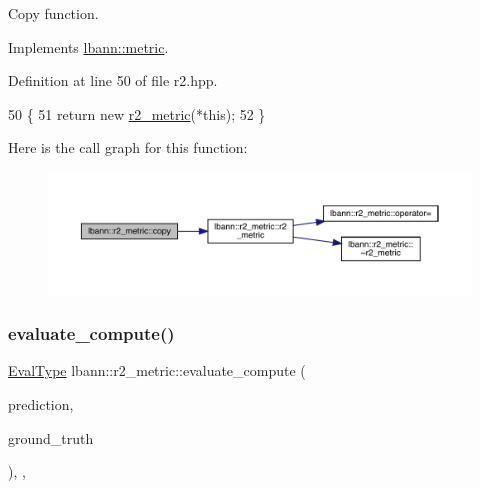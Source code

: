 Copy function. 

Implements \hyperlink{classlbann_1_1metric_a2a4498d41f77da8585552f485caab167}{lbann\+::metric}.



Definition at line 50 of file r2.\+hpp.


\begin{DoxyCode}
50                                    \{
51     \textcolor{keywordflow}{return} \textcolor{keyword}{new} \hyperlink{classlbann_1_1r2__metric_a9c6bffbb4724c77a8e6f8b1a2e7b27c7}{r2\_metric}(*\textcolor{keyword}{this});
52   \}
\end{DoxyCode}
Here is the call graph for this function\+:\nopagebreak
\begin{figure}[H]
\begin{center}
\leavevmode
\includegraphics[width=350pt]{classlbann_1_1r2__metric_a2536209f1d575b639ab351854d54f207_cgraph}
\end{center}
\end{figure}
\mbox{\label{classlbann_1_1r2__metric_a06c84d7944d1d5be896de6b98950e05e}} 
\subsubsection{\texorpdfstring{evaluate\+\_\+compute()}{evaluate\_compute()}}
{\footnotesize\ttfamily \hyperlink{base_8hpp_a3266f5ac18504bbadea983c109566867}{Eval\+Type} lbann\+::r2\+\_\+metric\+::evaluate\+\_\+compute (\begin{DoxyParamCaption}\item[{const \hyperlink{base_8hpp_a9a697a504ae84010e7439ffec862b470}{Abs\+Dist\+Mat} \&}]{prediction,  }\item[{const \hyperlink{base_8hpp_a9a697a504ae84010e7439ffec862b470}{Abs\+Dist\+Mat} \&}]{ground\+\_\+truth }\end{DoxyParamCaption})\hspace{0.3cm}{\ttfamily [override]}, {\ttfamily [protected]}, {\ttfamily [virtual]}}

